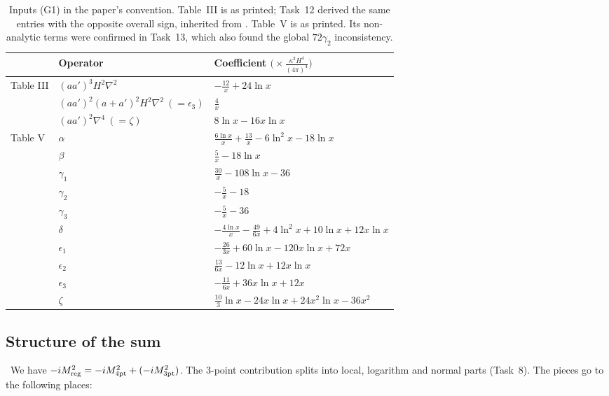 \begin{table}[ht]
\centering\small
\renewcommand{\arraystretch}{1.4}
\begin{tabular}{lll}
\toprule
& Operator & Coefficient $\big(\times\frac{\kappa^2H^4}{(4\pi)^4}\big)$ \\
\midrule
Table III & $(aa')^3H^2\nabla^2$ & $-\frac{12}{x}+24\ln x$ \\
& $(aa')^2(a+a')^2H^2\nabla^2\ (=\epsilon_3)$ & $\frac4x$ \\
& $(aa')^2\nabla^4\ (=\zeta)$ & $8\ln x-16x\ln x$ \\
\midrule
Table V & $\alpha$ & $\frac{6\ln x}{x}+\frac{13}{x}-6\ln^2x-18\ln x$ \\
& $\beta$ & $\frac5x-18\ln x$ \\
& $\gamma_1$ & $\frac{30}{x}-108\ln x-36$ \\
& $\gamma_2$ & $-\frac5x-18$ \\
& $\gamma_3$ & $-\frac5x-36$ \\
& $\delta$ & $-\frac{4\ln x}{x}-\frac{49}{6x}+4\ln^2x+10\ln x+12x\ln x$ \\
& $\epsilon_1$ & $-\frac{26}{3x}+60\ln x-120x\ln x+72x$ \\
& $\epsilon_2$ & $\frac{13}{6x}-12\ln x+12x\ln x$ \\
& $\epsilon_3$ & $-\frac{11}{6x}+36x\ln x+12x$ \\
& $\zeta$ & $\frac{10}{3}\ln x-24x\ln x+24x^2\ln x-36x^2$ \\
\bottomrule
\end{tabular}
\caption{Inputs (G1) in the paper's convention. Table~III is as printed; Task~12 derived the same entries with the opposite overall sign, inherited from .
Table~V is as printed. Its non-analytic terms were confirmed in Task~13, which also found the global $72\gamma_2$ inconsistency.}
\label{tab:ch08-inputs17}
\end{table}

\subsection{Structure of the sum}
\tD\ We have $-iM^2_{\rm reg}=-iM^2_{\rm 4pt}+(-iM^2_{\rm 3pt})$. The 3-point contribution splits into local, logarithm and normal parts (Task~8). The pieces go to the following places:

